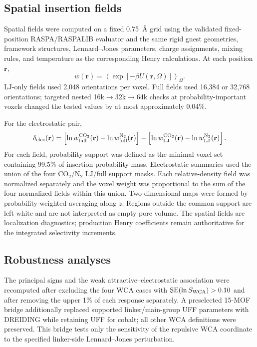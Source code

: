 \documentclass[11pt,a4paper]{article}
\begin{document}
\subsection{Spatial insertion fields}

Spatial fields were computed on a fixed 0.75~\AA{} grid using the validated fixed-position RASPA/RASPALIB evaluator and the same rigid guest geometries, framework structures, Lennard--Jones parameters, charge assignments, mixing rules, and temperature as the corresponding Henry calculations. At each position $\mathbf r$,
\begin{equation}
w(\mathbf r)=
\left\langle
\exp[-\beta U(\mathbf r,\Omega)]
\right\rangle_{\Omega}.
\end{equation}
LJ-only fields used 2,048 orientations per voxel. Full fields used 16,384 or 32,768 orientations; targeted nested 16k$\rightarrow$32k$\rightarrow$64k checks at probability-important voxels changed the tested values by at most approximately 0.04\%.

For the electrostatic pair,
\begin{equation}
\delta_{\rm elec}(\mathbf r)
=
\left[
\ln w_{\rm full}^{\mathrm{CO_2}}(\mathbf r)
-\ln w_{\rm full}^{\mathrm{N_2}}(\mathbf r)
\right]
-
\left[
\ln w_{\rm LJ}^{\mathrm{CO_2}}(\mathbf r)
-\ln w_{\rm LJ}^{\mathrm{N_2}}(\mathbf r)
\right].
\end{equation}
For each field, probability support was defined as the minimal voxel set containing 99.5\% of insertion-probability mass. Electrostatic summaries used the union of the four CO$_2$/N$_2$ LJ/full support masks. Each relative-density field was normalized separately and the voxel weight was proportional to the sum of the four normalized fields within this union. Two-dimensional maps were formed by probability-weighted averaging along $z$. Regions outside the common support are left white and are not interpreted as empty pore volume. The spatial fields are localization diagnostics; production Henry coefficients remain authoritative for the integrated selectivity increments.

\subsection{Robustness analyses}

The principal signs and the weak attractive--electrostatic association were recomputed after excluding the four WCA cases with $\mathrm{SE}(\ln S_{\rm WCA})>0.10$ and after removing the upper 1\% of each response separately. A preselected 15-MOF bridge additionally replaced supported linker/main-group UFF parameters with DREIDING while retaining UFF for cobalt; all other WCA definitions were preserved. This bridge tests only the sensitivity of the repulsive WCA coordinate to the specified linker-side Lennard--Jones perturbation.
\end{document}
